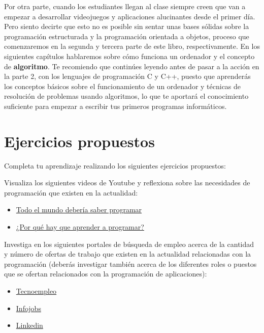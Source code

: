 Por otra parte, cuando los estudiantes llegan al clase siempre creen que van a empezar a desarrollar videojuegos y aplicaciones
alucinantes desde el primer día. Pero siento decirte que esto no es posible sin sentar unas bases sólidas sobre la programación
estructurada y la programación orientada a objetos, proceso que comenzaremos en la segunda y tercera parte de este libro, 
respectivamente. En los siguientes capítulos hablaremos sobre cómo funciona un ordenador y el concepto de \textbf{algoritmo}. Te
recomiendo que continúes leyendo antes de pasar a la acción en la parte 2, con los lenguajes de programación C y C++, puesto
que aprenderás los conceptos básicos sobre el funcionamiento de un ordenador y técnicas de resolución de problemas usando
algoritmos, lo que te aportará el conocimiento suficiente para empezar a escribir tus primeros programas informáticos.

\section{Ejercicios propuestos}

Completa tu aprendizaje realizando los siguientes ejercicios propuestos:

\begin{exercise}
Visualiza los siguientes videos de Youtube y reflexiona sobre las necesidades de programación que existen en la actualidad:

\begin{itemize}
 \item \href{https://www.youtube.com/watch?v=X5Wkp1gsNik}{Todo el mundo debería saber programar}
 \item \href{https://www.youtube.com/watch?v=wldGsJTPJ1o}{¿Por qué hay que aprender a programar?}
\end{itemize}
\end{exercise}

\begin{exercise}
Investiga en los siguientes portales de búsqueda de empleo acerca de la cantidad y número de ofertas de trabajo que existen
en la actualidad relacionadas con la programación (deberás investigar también acerca de los diferentes roles o puestos
que se ofertan relacionados con la programación de aplicaciones):

\begin{itemize}
 \item \href{https://www.tecnoempleo.com/}{Tecnoempleo}
 \item \href{https://www.infojobs.net/}{Infojobs}
 \item \href{https://www.linkedin.com/}{Linkedin}
\end{itemize}
\end{exercise}
